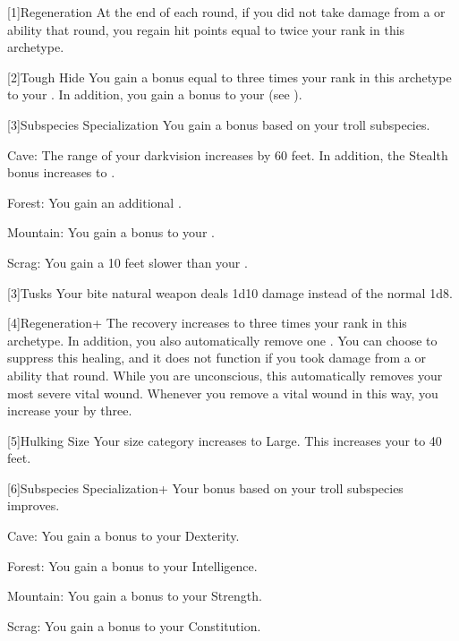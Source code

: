     [1]{Regeneration} At the end of each round, if you did not take damage from a \atAcid or \atFire ability that round, you regain hit points equal to twice your rank in this archetype.

    [2]{Tough Hide} You gain a bonus equal to three times your rank in this archetype to your .
      In addition, you gain a  bonus to your  (see ).

    [3]{Subspecies Specialization} You gain a bonus based on your troll subspecies.
      \begin{raggeditemize}
        \item Cave: The range of your darkvision increases by 60 feet.
          In addition, the Stealth bonus increases to .
        \item Forest: You gain an additional .
        \item Mountain: You gain a  bonus to your .
        \item Scrag: You gain a  10 feet slower than your .
      \end{raggeditemize}

    [3]{Tusks} Your bite natural weapon deals 1d10 damage instead of the normal 1d8.

    [4]{Regeneration+} The recovery increases to three times your rank in this archetype.
      In addition, you also automatically remove one .
      You can choose to suppress this healing, and it does not function if you took damage from a \atAcid or \atFire ability that round.
      While you are unconscious, this automatically removes your most severe vital wound.
      Whenever you remove a vital wound in this way, you increase your  by three.

    [5]{Hulking Size} Your size category increases to Large.
      This increases your  to 40 feet.

    [6]{Subspecies Specialization+} Your bonus based on your troll subspecies improves.
      \begin{raggeditemize}
        \item Cave: You gain a  bonus to your Dexterity.
        \item Forest: You gain a  bonus to your Intelligence.
        \item Mountain: You gain a  bonus to your Strength.
        \item Scrag: You gain a  bonus to your Constitution.
      \end{raggeditemize}

